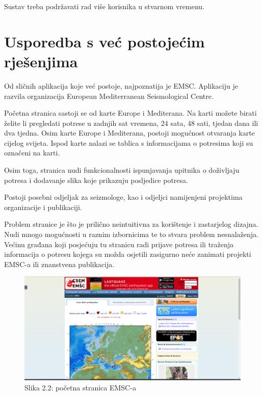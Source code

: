 Sustav treba podržavati rad više korisnika u stvarnom vremenu.\\



\section{Usporedba s već postojećim rješenjima}

{Od sličnih aplikacija koje već postoje, najpoznatija je EMSC. Aplikaciju je razvila organizacija European Mediterranean Seismological Centre.
	
Početna stranica sastoji se od karte Europe i Mediterana. Na karti možete birati želite li pregledati potrese u zadnjih sat  vremena, 24 sata, 48 sati, tjedan dana ili dva tjedna. Osim karte Europe i Mediterana, postoji mogućnost otvaranja karte cijelog svijeta.
Ispod karte nalazi se tablica s informacijama o potresima koji su označeni na karti.

Osim toga, stranica nudi funkcionalnosti ispunjavanja upitnika o doživljaju potresa i dodavanje slika koje prikazuju posljedice potresa.

Postoji posebni odjeljak za seizmologe, kao i odjeljci namijenjeni projektima organizacije i publikaciji.

Problem stranice je što je prilično neintuitivna za korištenje i zastarjelog dizajna. Nudi mnogo mogućnosti u raznim izbornicima te to stvara problem nesnalaženja. Većinu građana koji posjećuju tu stranicu radi prijave potresa ili traženja informacija o potresu kojega su možda osjetili zasigurno neće zanimati projekti EMSC-a ili znanstvena publikacija.}

\begin{figure}[H]
			\includegraphics[width=\textwidth]{slike/emsc1.PNG} %
			\caption{Slika 2.2: početna stranica EMSC-a}
			\label{fig:promjene2} %
		\end{figure}


